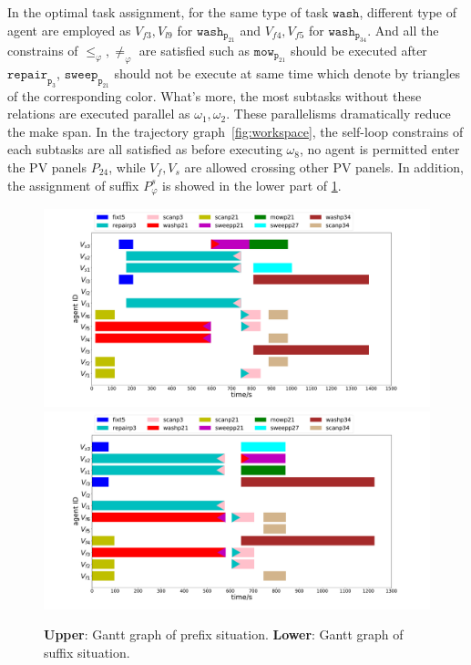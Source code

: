 In the optimal task assignment, for the same type of task $\texttt{wash}$,
different type of agent are employed as $V_{f3},V_{l9}$ for $\texttt{wash}_{\texttt{p}_{21}}$ and
 $V_{f4},V_{f5}$ for $\texttt{wash}_{\texttt{p}_{34}}$. And all the constrains 
 of $\leq_\varphi,\neq_\varphi$ are satisfied such as $\texttt{mow}_{\texttt{p}_{21}}$ 
should be executed after $\texttt{repair}_{\texttt{p}_3}$, $\texttt{sweep}_{\texttt{p}_21}$
should not be execute at same time which denote by triangles of the corresponding color.
What's more, the most subtasks without these relations are executed parallel as $\omega_1,\omega_2$.
These parallelisms dramatically reduce the make span.
In the trajectory graph~\ref{fig:workspace}, the self-loop constrains of each subtasks are all satisfied
as before executing $\omega_8$, no agent is permitted enter the PV panels $P_{24}$, while $V_f, V_s$ are allowed 
crossing other PV panels.
In addition, the assignment of
suffix $P^s_\varphi$ is showed in the lower part of \ref{Gantt_graph}.


\begin{figure}[t!]
  \begin{minipage}[t]{1\linewidth}
		\includegraphics[height =0.5\textwidth]{figures/simulation/taskfinal/gantt_sim.pdf}
	
\end{minipage}%

\begin{minipage}[t]{1\linewidth}
	\centering
	\includegraphics[width =1\textwidth]{ figures/simulation/taskfinal/gantt_graph_suffix.pdf}
\end{minipage}%
   \centering %
   \label{Gantt_graph}
\caption{\textbf{Upper}: Gantt graph of prefix situation. \textbf{Lower}: Gantt graph of suffix situation. } 
\end{figure}

